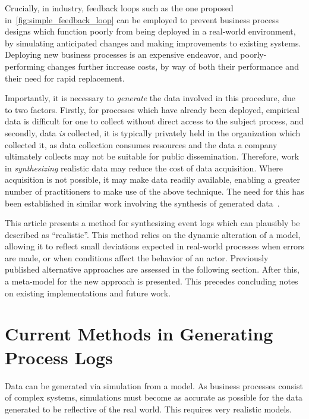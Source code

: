 \documentclass[12pt]{llncs}  %
\begin{document}
Crucially, in industry, feedback loops such as the one proposed
in~\cref{fig:simple_feedback_loop} can be employed to prevent business process
designs which function poorly from being deployed in a real-world environment,
by simulating anticipated changes and making improvements to existing systems.
Deploying new business processes is an expensive endeavor, and poorly-performing
changes further increase costs, by way of both their performance and their need
for rapid replacement.
\par

Importantly, it is necessary to \emph{generate} the data involved in this
procedure, due to two factors. Firstly, for processes which have already been
deployed, empirical data is difficult for one to collect without direct access
to the subject process, and secondly, data \emph{is} collected, it is typically
privately held in the organization which collected it, as data collection
consumes resources and the data a company ultimately collects may not be
suitable for public dissemination. Therefore, work in \emph{synthesizing}
realistic data may reduce the cost of data acquisition. Where acquisition is not
possible, it may make data readily available, enabling a greater number of
practitioners to make use of the above technique. The need for this has been
established in similar work involving the synthesis of generated
data~\citep{accorsi2013secsy,pourmasoumi2015business,mitsyuk2017generating}.
\par

This article presents a method for synthesizing event logs which can plausibly
be described as ``realistic''. This method relies on the dynamic alteration of a
model, allowing it to reflect small deviations expected in real-world processes
when errors are made, or when conditions affect the behavior of an actor.
Previously published alternative approaches are assessed in the following
section. After this, a meta-model for the new approach is presented. This
precedes concluding notes on existing implementations and future work.


\section{Current Methods in Generating Process Logs}
Data can be generated via simulation from a model. As business processes consist
of complex systems, simulations must become as accurate as possible for the data
generated to be reflective of the real world. This requires very realistic
models.
\par
\end{document}
